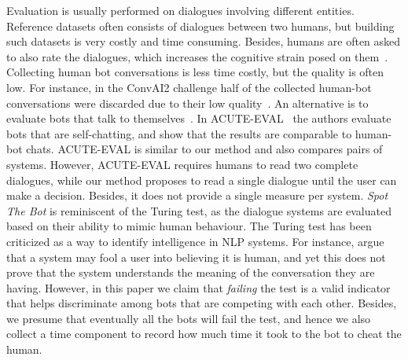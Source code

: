 Evaluation is usually performed on dialogues involving different entities. Reference datasets often consists of dialogues between two humans, but building such datasets is very costly and time consuming. Besides, humans are often asked to also rate the dialogues, which increases the cognitive strain posed on them~\cite{SCHMITT201512}. Collecting human bot conversations is less time costly, but the quality is often low. For instance, in the ConvAI2 challenge half of the collected human-bot conversations were discarded due to their low quality~\cite{convai12}. 
An alternative is to evaluate bots that talk to themselves~\cite{ghandeharioun2019approximating,li2019acuteeval,deriu-cieliebak-2019-towards}. In ACUTE-EVAL~\cite{li2019acuteeval} the authors evaluate bots that are self-chatting, and show that the results are comparable to human-bot chats. ACUTE-EVAL is similar to our method and also compares pairs of systems. However, ACUTE-EVAL requires humans to read two complete dialogues, while our method proposes to read a single dialogue until the user can make a decision. Besides, it does not provide a single measure per system.
\emph{Spot The Bot} is reminiscent of the Turing test, as the dialogue systems are evaluated based on their ability to mimic human behaviour. The Turing test has been criticized as a way to identify intelligence in NLP systems. For instance, \citet{bender-2020-acl} argue that a system may fool a user into believing it is human, and yet this does not prove that the system understands the meaning of the conversation they are having. However, in this paper we claim that \emph{failing} the test is a valid indicator that helps discriminate among bots that are competing with each other. Besides, we presume that eventually all the bots will fail the test, and hence we also collect a time component to record how much time it took to the bot to cheat the human.




